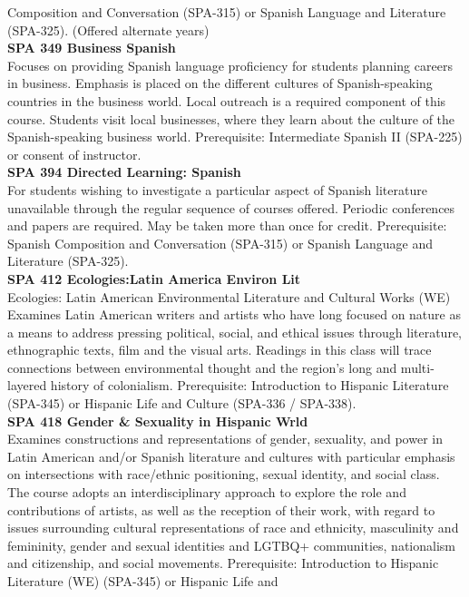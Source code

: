\documentclass[
  letterpaper,
]{scrbook}
\begin{document}
Composition and Conversation (SPA-315) or Spanish Language and
Literature (SPA-325). (Offered alternate years)\\
\textbf{SPA 349 Business Spanish}\\
Focuses on providing Spanish language proficiency for students planning
careers in business. Emphasis is placed on the different cultures of
Spanish-speaking countries in the business world. Local outreach is a
required component of this course. Students visit local businesses,
where they learn about the culture of the Spanish-speaking business
world. Prerequisite: Intermediate Spanish II (SPA-225) or consent of
instructor.\\
\textbf{SPA 394 Directed Learning: Spanish}\\
For students wishing to investigate a particular aspect of Spanish
literature unavailable through the regular sequence of courses offered.
Periodic conferences and papers are required. May be taken more than
once for credit. Prerequisite: Spanish Composition and Conversation
(SPA-315) or Spanish Language and Literature (SPA-325).\\
\textbf{SPA 412 Ecologies:Latin America Environ Lit}\\
Ecologies: Latin American Environmental Literature and Cultural Works
(WE) Examines Latin American writers and artists who have long focused
on nature as a means to address pressing political, social, and ethical
issues through literature, ethnographic texts, film and the visual arts.
Readings in this class will trace connections between environmental
thought and the region's long and multi-layered history of colonialism.
Prerequisite: Introduction to Hispanic Literature (SPA-345) or Hispanic
Life and Culture (SPA-336 / SPA-338).\\
\textbf{SPA 418 Gender \& Sexuality in Hispanic Wrld}\\
Examines constructions and representations of gender, sexuality, and
power in Latin American and/or Spanish literature and cultures with
particular emphasis on intersections with race/ethnic positioning,
sexual identity, and social class. The course adopts an
interdisciplinary approach to explore the role and contributions of
artists, as well as the reception of their work, with regard to issues
surrounding cultural representations of race and ethnicity, masculinity
and femininity, gender and sexual identities and LGTBQ+ communities,
nationalism and citizenship, and social movements. Prerequisite:
Introduction to Hispanic Literature (WE) (SPA-345) or Hispanic Life and
\end{document}
